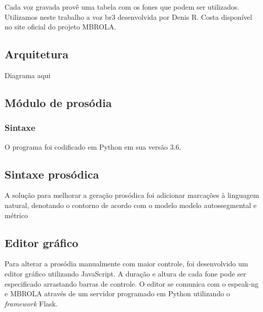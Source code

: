 Cada voz gravada provê uma tabela com os fones que podem ser utilizados. Utilizamos neste trabalho a voz br3 desenvolvida por Denis R. Costa disponível no site oficial do projeto MBROLA.

\subsection{Arquitetura}
Diagrama aqui

\subsection{Módulo de prosódia}
\subsubsection{Sintaxe}
O programa foi codificado em Python em sua versão 3.6.

\subsection{Sintaxe prosódica}
A solução para melhorar a geração prosódica foi adicionar marcações à linguagem
natural, denotando o contorno de acordo com o modelo modelo autossegmental e métrico

\subsection{Editor gráfico}
Para alterar a prosódia manualmente com maior controle, foi desenvolvido um
editor gráfico utilizando JavaScript. A duração e altura de cada fone pode ser
especificado arrastando barras de controle. O editor se comunica com o espeak-ng
e MBROLA através de um servidor programado em Python utilizando o
\emph{framework} Flask.

